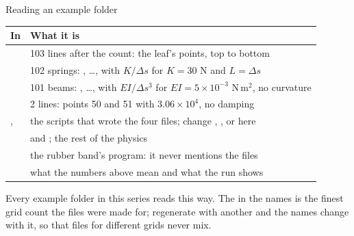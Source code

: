 \documentclass[aspectratio=169,11pt]{beamer}
\begin{document}
\begin{frame}{Reading an example folder}
\scriptsize
\begin{tabular}{@{}L{0.3\textwidth}L{0.62\textwidth}@{}}
\toprule
In  & What it is\\
\midrule
{} & 103 lines after the count: the leaf's points, top to bottom\\
 & 102 springs: , \ldots, with $K/\Delta s$ for $K = 30$ N and $L = \Delta s$\\
 & 101 beams: , \ldots, with $EI/\Delta s^3$ for $EI = 5\times10^{-3}$ N\,m$^2$, no curvature\\
 & 2 lines: points 50 and 51 with $3.06\times10^4$, no damping\\
,  & the scripts that wrote the four files; change , ,  or  here\\
 &  and ; the rest of the physics\\
 & the rubber band's program: it never mentions the files\\
 & what the numbers above mean and what the run shows\\
\bottomrule
\end{tabular}
\vspace{2mm}
\begin{punchbox}
\small Every example folder in this series reads this way. The  in the names is the finest grid count the files were made for; regenerate with another  and the names change with it, so that files for different grids never mix.
\end{punchbox}
\end{frame}
\end{document}
